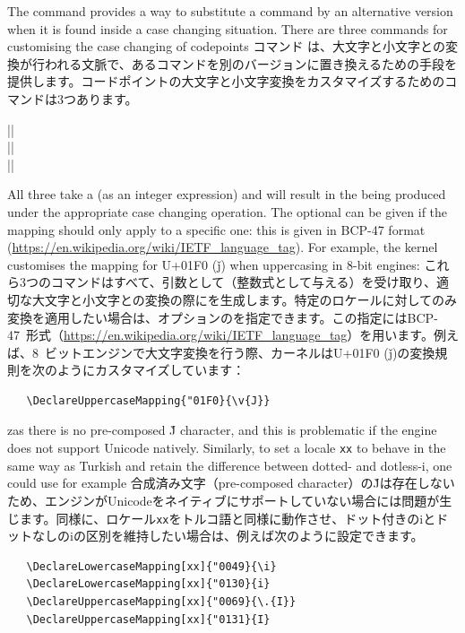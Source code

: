 \documentclass{ltxguide}
\newcommand\jpnewline{\vspace{3pt}\newline}
\begin{document}
The command  provides a way to substitute a
command by an alternative version when it is found inside a case changing
situation. There are three commands for customising the case changing of
codepoints
\jpnewline
コマンド は、大文字と小文字との変換が行われる文脈で、あるコマンドを別のバージョンに置き換えるための手段を提供します。コードポイントの大文字と小文字変換をカスタマイズするためのコマンドは3つあります。
\begin{decl}
  |\DeclareLowercaseMapping|    \\
  |\DeclareTitlecaseMapping|    \\
  |\DeclareUppercaseMapping|   
\end{decl}
All three take a  (as an integer expression) and will
result in the  being produced under the appropriate case changing
operation. The optional  can be given if the mapping should only
apply to a specific one: this is given in BCP-47 format
(\url{https://en.wikipedia.org/wiki/IETF_language_tag}). For example,
the kernel customises the mapping for U+01F0 (\v{j}) when uppercasing in
8-bit engines:
\jpnewline
これら3つのコマンドはすべて、引数として（整数式として与える）を受け取り、適切な大文字と小文字との変換の際にを生成します。特定のロケールに対してのみ変換を適用したい場合は、オプションのを指定できます。この指定にはBCP-47~形式（\url{https://en.wikipedia.org/wiki/IETF_language_tag}）を用います。例えば、8~ビットエンジンで大文字変換を行う際、カーネルはU+01F0 (\v{j})の変換規則を次のようにカスタマイズしています：
\begin{verbatim}
   \DeclareUppercaseMapping{"01F0}{\v{J}}
\end{verbatim}
zas there is no pre-composed \v{J} character, and this is problematic if
the engine does not support Unicode natively. Similarly, to set a locale
\texttt{xx} to behave in the same way as Turkish and retain the difference
between dotted- and dotless-i, one could use for example
\jpnewline
合成済み文字（pre-composed character）の\v{J}は存在しないため、エンジンがUnicodeをネイティブにサポートしていない場合には問題が生じます。同様に、ロケール\texttt{xx}をトルコ語と同様に動作させ、ドット付きのiとドットなしのiの区別を維持したい場合は、例えば次のように設定できます。
\begin{verbatim}
   \DeclareLowercaseMapping[xx]{"0049}{\i}
   \DeclareLowercaseMapping[xx]{"0130}{i}
   \DeclareUppercaseMapping[xx]{"0069}{\.{I}}
   \DeclareUppercaseMapping[xx]{"0131}{I}
\end{verbatim}
\end{document}
